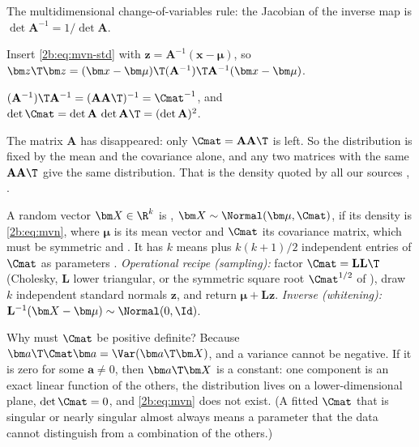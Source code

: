 \begin{explain}
  \item The multidimensional change-of-variables rule: the Jacobian of the inverse map is $\det\mathbf A^{-1}=1/\det\mathbf A$.
  \item Insert \eqref{2b:eq:mvn-std} with $\bm z=\mathbf A^{-1}(\bm x-\bm\mu)$, so $\bm z\T\bm z=(\bm x-\bm\mu)\T(\mathbf A^{-1})\T\mathbf A^{-1}(\bm x-\bm\mu)$.
  \item $(\mathbf A^{-1})\T\mathbf A^{-1}=(\mathbf A\mathbf A\T)^{-1}=\Cmat^{-1}$, and $\det\Cmat=\det\mathbf A\,\det\mathbf A\T=(\det\mathbf A)^2$.
\end{explain}
The matrix $\mathbf A$ has disappeared: only $\Cmat=\mathbf A\mathbf A\T$ is left. So the distribution is fixed by the mean and the covariance alone, and any two matrices with the same $\mathbf A\mathbf A\T$ give the same distribution. That is the density quoted by all our sources , .

\begin{workdef}
A random vector $\bm X\in\R^k$ is , $\bm X\sim\Normal(\bm\mu,\Cmat)$, if its density is \eqref{2b:eq:mvn}, where $\bm\mu$ is its mean vector and $\Cmat$ its covariance matrix, which must be symmetric and  . It has $k$ means plus $k(k+1)/2$ independent entries of $\Cmat$ as parameters .
\emph{Operational recipe (sampling):} factor $\Cmat=\mathbf L\mathbf L\T$ (Cholesky, $\mathbf L$ lower triangular, or the symmetric square root $\Cmat^{1/2}$ of ), draw $k$ independent standard normals $\bm z$, and return $\bm\mu+\mathbf L\bm z$. \emph{Inverse (whitening):} $\mathbf L^{-1}(\bm X-\bm\mu)\sim\Normal(0,\Id)$.
\end{workdef}

Why must $\Cmat$ be positive definite? Because $\bm a\T\Cmat\bm a=\Var(\bm a\T\bm X)$, and a variance cannot be negative. If it is zero for some $\bm a\neq0$, then $\bm a\T\bm X$ is a constant: one component is an exact linear function of the others, the distribution lives on a lower-dimensional plane, $\det\Cmat=0$, and \eqref{2b:eq:mvn} does not exist. (A fitted $\Cmat$ that is singular or nearly singular almost always means a parameter that the data cannot distinguish from a combination of the others.)

